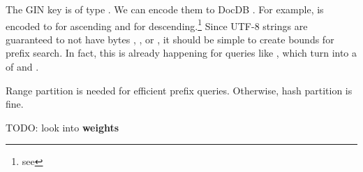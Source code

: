 The GIN key is of type .  We can encode them to DocDB
.  For example,  is encoded to
 for ascending and
 for descending.\footnote{see
}  Since UTF-8 strings are guaranteed to not
have bytes , , or , it
should be simple to create bounds for prefix search.  In fact, this is already
happening for queries like , which turn into a
 of  and .

Range partition is needed for efficient prefix queries.  Otherwise, hash
partition is fine.

TODO: look into  \textbf{weights}
